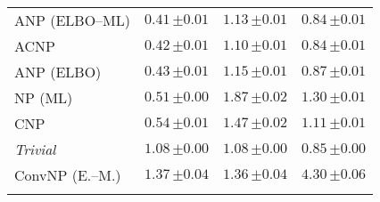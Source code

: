 \begin{tabular}[t]{lccc}
ANP (ELBO--ML) & $0.41\,{ \scriptstyle \pm  0.01 }$ & $1.13\,{ \scriptstyle \pm  0.01 }$ & $0.84\,{ \scriptstyle \pm  0.01 }$ \\ 
ACNP & $0.42\,{ \scriptstyle \pm  0.01 }$ & $1.10\,{ \scriptstyle \pm  0.01 }$ & $0.84\,{ \scriptstyle \pm  0.01 }$ \\ 
ANP (ELBO) & $0.43\,{ \scriptstyle \pm  0.01 }$ & $1.15\,{ \scriptstyle \pm  0.01 }$ & $0.87\,{ \scriptstyle \pm  0.01 }$ \\ 
NP (ML) & $0.51\,{ \scriptstyle \pm  0.00 }$ & $1.87\,{ \scriptstyle \pm  0.02 }$ & $1.30\,{ \scriptstyle \pm  0.01 }$ \\ 
CNP & $0.54\,{ \scriptstyle \pm  0.01 }$ & $1.47\,{ \scriptstyle \pm  0.02 }$ & $1.11\,{ \scriptstyle \pm  0.01 }$ \\ 
{\normalshape \textit{Trivial}} & $1.08\,{ \scriptstyle \pm  0.00 }$ & $1.08\,{ \scriptstyle \pm  0.00 }$ & $0.85\,{ \scriptstyle \pm  0.00 }$ \\ 
ConvNP (E.--M.) & $1.37\,{ \scriptstyle \pm  0.04 }$ & $1.36\,{ \scriptstyle \pm  0.04 }$ & $4.30\,{ \scriptstyle \pm  0.06 }$ \\ 
\bottomrule \\ 
\end{tabular} 
